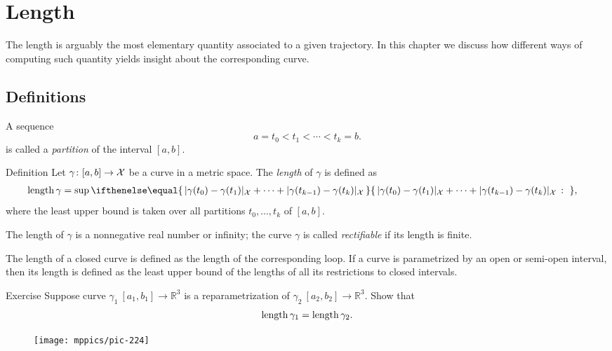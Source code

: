 \chapter{Length}
\label{chap:length}

The length is arguably the most elementary quantity associated to a given trajectory. In this chapter we discuss how different ways of computing such quantity yields insight about the corresponding curve. 


\section{Definitions}

A sequence 
\[a=t_0 < t_1 < \cdots < t_k=b.\]
is called a \emph{partition} of the interval $[a,b]$.

\begin{thm}{Definition}\label{def:length}
Let $\gamma\colon[a,b]\to \mathcal{X}$ be a curve in a metric space.
The \emph{length} of $\gamma$ is defined as
\begin{align*}
\length \gamma
&= 
\sup
\set{\dist{\gamma(t_0)}{\gamma(t_1)}{\spc{X}}
+\dots+
\dist{\gamma(t_{k-1})}{\gamma(t_k)}{\spc{X}}}{},
\end{align*}
where the least upper bound is taken over all partitions $t_0,\dots,t_k$ of $[a,b]$.

The length of $\gamma$ is a nonnegative real number or infinity;
the curve $\gamma$ is called \emph{rectifiable} if its length is finite. 

The length of a closed curve is defined as the length of the corresponding loop.
If a curve is parametrized by an open or semi-open interval, then its length is defined as the least upper bound of the lengths of all its restrictions to closed intervals.
\end{thm}


\begin{thm}{Exercise}\label{ex:integral-length-0}
Suppose curve $\gamma_1\:[a_1,b_1] \to\mathbb{R}^3$ is a reparametrization of $\gamma_2\:[a_2,b_2] \to\mathbb{R}^3$. 
Show that
\[\mathop{\rm length}\nolimits \gamma_1 = \mathop{\rm length}\nolimits \gamma_2.\]

\end{thm}

\begin{wrapfigure}[4]{r}{33 mm}
\vskip-0mm
\centering
\texttt{[image: mppics/pic-224]}
\end{wrapfigure}

